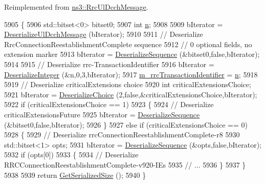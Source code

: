 Reimplemented from \hyperlink{classns3_1_1RrcUlDcchMessage_a76f7263f39a6dbb893a42300d4e72e09}{ns3\+::\+Rrc\+Ul\+Dcch\+Message}.


\begin{DoxyCode}
5905 \{
5906   std::bitset<0> bitset0;
5907   \textcolor{keywordtype}{int} \hyperlink{namespacesample-rng-plot_aeb5ee5c431e338ef39b7ac5431242e1d}{n};
5908 
5909   bIterator = \hyperlink{classns3_1_1RrcUlDcchMessage_a11b944acd9ea5a459cc49a9fa11c3161}{DeserializeUlDcchMessage} (bIterator);
5910 
5911   \textcolor{comment}{// Deserialize RrcConnectionReestablishmentComplete sequence}
5912   \textcolor{comment}{// 0 optional fields, no extension marker}
5913   bIterator = \hyperlink{classns3_1_1Asn1Header_a58c68bb97ba3fe2e8fcdd7c208d672b2}{DeserializeSequence} (&bitset0,\textcolor{keyword}{false},bIterator);
5914 
5915   \textcolor{comment}{// Deserialize rrc-TransactionIdentifier}
5916   bIterator = \hyperlink{classns3_1_1Asn1Header_a49802c9af30018b078150e866b6ecae2}{DeserializeInteger} (&n,0,3,bIterator);
5917   \hyperlink{classns3_1_1RrcConnectionReestablishmentCompleteHeader_a759dcb11e1319b0950d6b1a607e8b802}{m\_rrcTransactionIdentifier} = \hyperlink{namespacesample-rng-plot_aeb5ee5c431e338ef39b7ac5431242e1d}{n};
5918 
5919   \textcolor{comment}{// Deserialize criticalExtensions choice}
5920   \textcolor{keywordtype}{int} criticalExtensionsChoice;
5921   bIterator = \hyperlink{classns3_1_1Asn1Header_a0af5881f07a0549a8693a1b75c229a90}{DeserializeChoice} (2,\textcolor{keyword}{false},&criticalExtensionsChoice,bIterator);
5922   \textcolor{keywordflow}{if} (criticalExtensionsChoice == 1)
5923     \{
5924       \textcolor{comment}{// Deserialize criticalExtensionsFuture}
5925       bIterator = \hyperlink{classns3_1_1Asn1Header_a58c68bb97ba3fe2e8fcdd7c208d672b2}{DeserializeSequence} (&bitset0,\textcolor{keyword}{false},bIterator);
5926     \}
5927   \textcolor{keywordflow}{else} \textcolor{keywordflow}{if} (criticalExtensionsChoice == 0)
5928     \{
5929       \textcolor{comment}{// Deserialize rrcConnectionReestablishmentComplete-r8}
5930       std::bitset<1> opts;
5931       bIterator = \hyperlink{classns3_1_1Asn1Header_a58c68bb97ba3fe2e8fcdd7c208d672b2}{DeserializeSequence} (&opts,\textcolor{keyword}{false},bIterator);
5932       \textcolor{keywordflow}{if} (opts[0])
5933         \{
5934           \textcolor{comment}{// Deserialize RRCConnectionReestablishmentComplete-v920-IEs}
5935           \textcolor{comment}{// ...}
5936         \}
5937     \}
5938 
5939   \textcolor{keywordflow}{return} \hyperlink{classns3_1_1Asn1Header_a18a67eb7869c5784f59d197bbd76a74f}{GetSerializedSize} ();
5940 \}
\end{DoxyCode}


